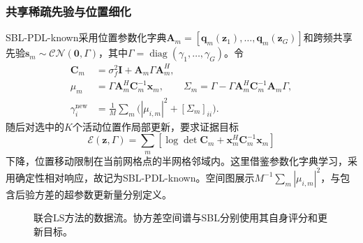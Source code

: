 \subsubsection{共享稀疏先验与位置细化}
SBL-PDL-known采用位置参数化字典$\mathbf A_m=[\mathbf q_m(\mathbf z_1),\ldots,\mathbf q_m(\mathbf z_G)]$和跨频共享先验$\mathbf s_m\sim\mathcal{CN}(\mathbf0,\Gamma)$，其中$\Gamma=\operatorname{diag}(\gamma_1,\ldots,\gamma_G)$。令
\begin{align}
\mathbf C_m&=\sigma_f^2\mathbf I+\mathbf A_m\Gamma\mathbf A_m^H,\\
\mu_m&=\Gamma\mathbf A_m^H\mathbf C_m^{-1}\mathbf x_m,\qquad
\Sigma_m=\Gamma-\Gamma\mathbf A_m^H\mathbf C_m^{-1}\mathbf A_m\Gamma,\\
\gamma_i^{\mathrm{new}}&=\frac1M\sum_m\bigl(|\mu_{i,m}|^2+[\Sigma_m]_{ii}\bigr).
\end{align}
随后对选中的$K$个活动位置作局部更新，要求证据目标
\begin{equation}\label{eq:new-evidence}
\mathcal E(\mathbf z,\Gamma)=\sum_m\left[\log\det\mathbf C_m+\mathbf x_m^H\mathbf C_m^{-1}\mathbf x_m\right]
\end{equation}
下降，位置移动限制在当前网格点的半网格邻域内。这里借鉴参数化字典学习\cite{ref13}，采用确定性相对响应，故记为SBL-PDL-known。空间图展示$M^{-1}\sum_m|\mu_{i,m}|^2$，与包含后验方差的超参数更新量分别定义。

\begin{figure}[htbp]\centering
{}
\caption{联合LS方法的数据流。协方差空间谱与SBL分别使用其自身评分和更新目标。}\label{fig:new-flow}
\end{figure}

